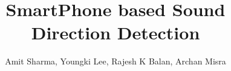 \documentclass{sig-alternate-05-2015}
\begin{document}


\title{SmartPhone based Sound Direction Detection}

%

%
\author{
%
%
\alignauthor
Amit Sharma, Youngki Lee, Rajesh K Balan, Archan Misra\\     
       \\
       \\
}




\end{document}
